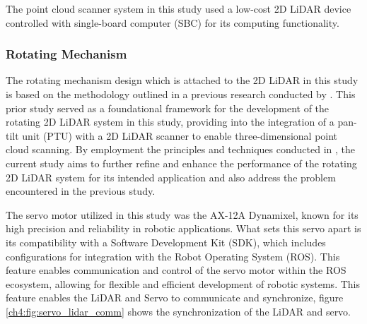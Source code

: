 The point cloud scanner system in this study used a low-cost 2D LiDAR device controlled with single-board computer (SBC) for its computing functionality. \\

\subsubsection*{Rotating Mechanism}

The rotating mechanism design which is attached to the 2D LiDAR in this study is based on the methodology outlined in a previous research conducted by \citet{clar2022}. This prior study served as a foundational framework for the development of the rotating 2D LiDAR system in this study, providing into the integration of a pan-tilt unit (PTU) with a 2D LiDAR scanner to enable three-dimensional point cloud scanning. By employment the principles and techniques conducted in \citet{clar2022}, the current study aims to further refine and enhance the performance of the rotating 2D LiDAR system for its intended application and also address the problem encountered in the previous study.

The servo motor utilized in this study was the AX-12A Dynamixel, known for its high precision and reliability in robotic applications. What sets this servo apart is its compatibility with a Software Development Kit (SDK), which includes configurations for integration with the Robot Operating System (ROS). This feature enables communication and control of the servo motor within the ROS ecosystem, allowing for flexible and efficient development of robotic systems. This feature enables the LiDAR and Servo to communicate and synchronize, figure \ref{ch4:fig:servo_lidar_comm} shows the synchronization of the LiDAR and servo. \\



